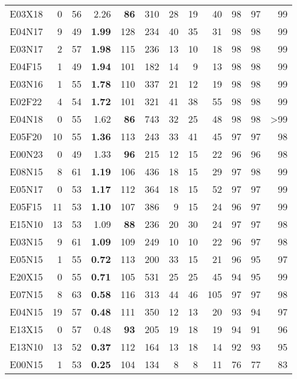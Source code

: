 \documentclass[ppgc,tese,english,formais,babel]{iiufrgs}
\newcommand{\bestcolumnemph}[1]{\textbf{#1}}
\begin{document}
\begin{table}
\begin{center}
\begin{tabular}{lrrrrrrrrrrr}
E03X18 & 0 & 56 & 2.26 & \bestcolumnemph{86} & 310 & 28 & 19 & 40 & 98 & 97 & 99 \\
E04N17 & 9 & 49 & \bestcolumnemph{1.99} & 128 & 234 & 40 & 35 & 31 & 98 & 98 & 99 \\
E03N17 & 2 & 57 & \bestcolumnemph{1.98} & 115 & 236 & 13 & 10 & 18 & 98 & 98 & 99 \\
E04F15 & 1 & 49 & \bestcolumnemph{1.94} & 101 & 182 & 14 & 9 & 13 & 98 & 98 & 99 \\
E03N16 & 1 & 55 & \bestcolumnemph{1.78} & 110 & 337 & 21 & 12 & 19 & 98 & 98 & 99 \\
E02F22 & 4 & 54 & \bestcolumnemph{1.72} & 101 & 321 & 41 & 38 & 55 & 98 & 98 & 99 \\
E04N18 & 0 & 55 & 1.62 & \bestcolumnemph{86} & 743 & 32 & 25 & 48 & 98 & 98 & >99 \\
E05F20 & 10 & 55 & \bestcolumnemph{1.36} & 113 & 243 & 33 & 41 & 45 & 97 & 97 & 98 \\
E00N23 & 0 & 49 & 1.33 & \bestcolumnemph{96} & 215 & 12 & 15 & 22 & 96 & 96 & 98 \\
E08N15 & 8 & 61 & \bestcolumnemph{1.19} & 106 & 436 & 18 & 15 & 29 & 97 & 98 & 99 \\
E05N17 & 0 & 53 & \bestcolumnemph{1.17} & 112 & 364 & 18 & 15 & 52 & 97 & 97 & 99 \\
E05F15 & 11 & 53 & \bestcolumnemph{1.10} & 107 & 386 & 9 & 15 & 24 & 96 & 97 & 99 \\
E15N10 & 13 & 53 & 1.09 & \bestcolumnemph{88} & 236 & 20 & 30 & 24 & 97 & 97 & 98 \\
E03N15 & 9 & 61 & \bestcolumnemph{1.09} & 109 & 249 & 10 & 10 & 22 & 96 & 97 & 98 \\
E05N15 & 1 & 55 & \bestcolumnemph{0.72} & 113 & 200 & 33 & 15 & 21 & 96 & 95 & 97 \\
E20X15 & 0 & 55 & \bestcolumnemph{0.71} & 105 & 531 & 25 & 25 & 45 & 94 & 95 & 99 \\
E07N15 & 8 & 63 & \bestcolumnemph{0.58} & 116 & 313 & 44 & 46 & 105 & 97 & 97 & 98 \\
E04N15 & 19 & 57 & \bestcolumnemph{0.48} & 111 & 350 & 12 & 13 & 20 & 93 & 94 & 97 \\
E13X15 & 0 & 57 & 0.48 & \bestcolumnemph{93} & 205 & 19 & 18 & 19 & 94 & 91 & 96 \\
E13N10 & 13 & 52 & \bestcolumnemph{0.37} & 112 & 164 & 13 & 18 & 14 & 92 & 93 & 95 \\
E00N15 & 1 & 53 & \bestcolumnemph{0.25} & 104 & 134 & 8 & 8 & 11 & 76 & 77 & 83 \\

\end{tabular}
\end{center}
\end{table}
\end{document}
